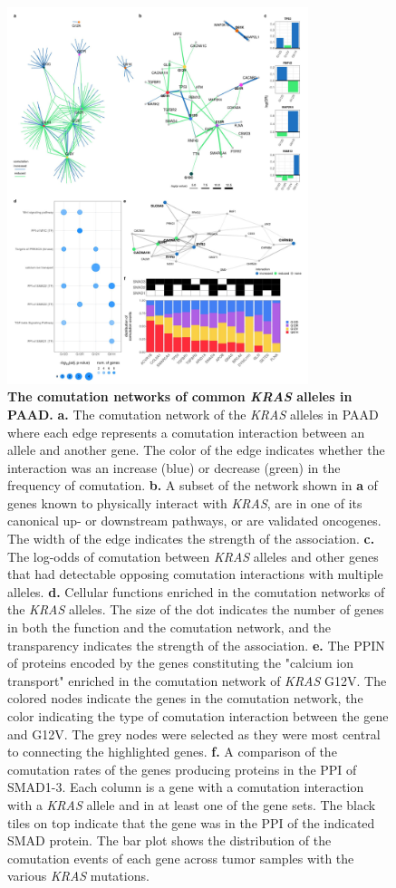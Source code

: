 \documentclass[english, 10pt, letterpaper]{article}
\newcommand{\KRAS}{\emph{KRAS}}
\begin{document}
\begin{figure}[p]
\centering
\includegraphics[height=110mm]{figures/SuppFigure_12.jpeg}
\caption{
    \textbf{The comutation networks of common \KRAS{} alleles in PAAD.}
    \textbf{a.} The comutation network of the \KRAS{} alleles in PAAD where each edge represents a comutation interaction between an allele and another gene. The color of the edge indicates whether the interaction was an increase (blue) or decrease (green) in the frequency of comutation.
    \textbf{b.} A subset of the network shown in \textbf{a} of genes known to physically interact with \KRAS{}, are in one of its canonical up- or downstream pathways, or are validated oncogenes. The width of the edge indicates the strength of the association.
    \textbf{c.} The log-odds of comutation between \KRAS{} alleles and other genes that had detectable opposing comutation interactions with multiple alleles.
    \textbf{d.} Cellular functions enriched in the comutation networks of the \KRAS{} alleles. The size of the dot indicates the number of genes in both the function and the comutation network, and the transparency indicates the strength of the association.
    \textbf{e.} The PPIN of proteins encoded by the genes constituting the "calcium ion transport" enriched in the comutation network of \KRAS{} G12V. The colored nodes indicate the genes in the comutation network, the color indicating the type of comutation interaction between the gene and G12V. The grey nodes were selected as they were most central to connecting the highlighted genes.
    \textbf{f.} A comparison of the comutation rates of the genes producing proteins in the PPI of SMAD1-3. Each column is a gene with a comutation interaction with a \KRAS{} allele and in at least one of the gene sets. The black tiles on top indicate that the gene was in the PPI of the indicated SMAD protein. The bar plot shows the distribution of the comutation events of each gene across tumor samples with the various \KRAS{} mutations.
}
\label{sfig:paad-comutation}
\end{figure}
\end{document}
